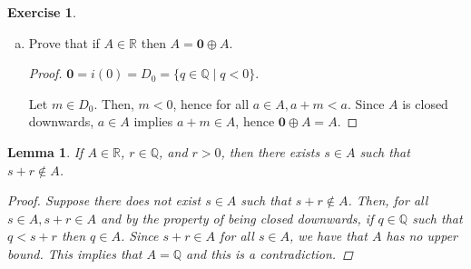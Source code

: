 \documentclass[11pt]{article}
\newcommand{\bbQ}{\mathbb{Q}}
\newcommand{\bbR}{\mathbb{R}}
\newtheorem{lemma}[theorem]{Lemma}
\theoremstyle{definition}
\newtheorem{exercise}[theorem]{Exercise}
\numberwithin{equation}{subsection}
\begin{document}
\begin{exercise}
\begin{enumerate}[(a)]
\begin{proof}
\renewcommand\qedsymbol{QED}
\end{proof}

		\item Prove that if $A \in \bbR$ then $A = \mathbf{0} \oplus A$. 
                
\begin{proof}
$\mathbf{0}=i(0)=D_0=\{q \in \bbQ \mid q<0\}$.

Let $m \in D_0$. Then, $m<0$, hence for all $a \in A, a+m<a$. Since $A$ is closed downwards, $a\in A$ implies $a+m \in A$, hence $\mathbf{0} \oplus A=A$.

\renewcommand\qedsymbol{QED}
\end{proof}

\end{enumerate}
\end{exercise}

\begin{lemma}
	\label{lem:in A close to not in A}
	If $A\in\bbR$, $r\in\bbQ$, and $r>0$, then there exists $s\in A$ such that $s+r\not\in A$.
        
\begin{proof}
Suppose there does not exist $s \in A$ such that $s+r \notin A$. Then, for all $s\in A, s+r \in A$ and by the property of being closed downwards, if $q \in \bbQ$ such that $q<s+r$ then $q \in A$. Since $s+r \in A$ for all $s \in A$, we have that $A$ has no upper bound. This implies that $A =\bbQ$ and this is a contradiction.
 
\renewcommand\qedsymbol{QED}
\end{proof}
\end{lemma}
\end{document}
